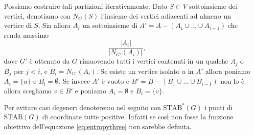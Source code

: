 Possiamo costruire tali partizioni iterativamente. Dato \(S\subset V\) sottoinsieme dei vertici, denotiamo con \(N_G(S)\) l'insieme dei vertici adiacenti ad almeno un vertice di \(S\). Sia allora \(A_i\) un sottoinsieme di \(A'=A-(A_1\cup\dots\cup A_{i-1})\) che renda massimo
\[\frac{|A_i|}{|N_{G'}(A_i)|},\]
dove \(G'\) \`e ottenuto da \(G\) rimuovendo tutti i vertici contenuti in un qualche \(A_j\) o \(B_j\) per \(j<i\), e \(B_i=N_{G'}(A_i)\). Se esiste un vertice isolato \(u\) in \(A'\) allora poniamo \(A_i=\{u\}\) e \(B_i=\emptyset\). Se invece \(A'\) \`e vuoto e \(B'=B-(B_1\cup\dots\cup B_{i-1})\) non lo \`e allora scegliamo \(v\in B'\) e poniamo \(A_i=\emptyset\) e \(B_i=\{v\}\).

Per evitare casi degeneri denoteremo nel seguito con \(\text{STAB}^{*}(G)\) i punti di \(\text{STAB}(G)\) di coordinate tutte positive. Infatti se così non fosse la funzione obiettivo dell'equazione \ref{eq:entropythree} non sarebbe definita.

